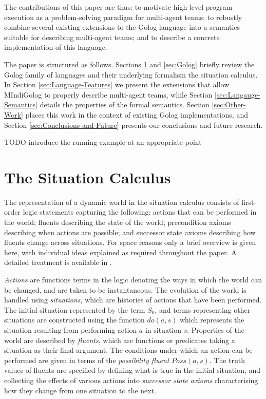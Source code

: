 \documentclass[letterpaper]{article}
\begin{document}
The contributions of this paper are thus: to motivate high-level program
execution as a problem-solving paradigm for multi-agent teams; to
robustly combine several existing extensions to the Golog language
into a semantics suitable for describing multi-agent teams; and to
describe a concrete implementation of this language.

The paper is structured as follows. Sections \ref{sec:Situation-Calculus}
and \ref{sec:Golog} briefly review the Golog family of languages
and their underlying formalism the situation calculus. In Section
\ref{sec:Language-Features} we present the extensions that allow
MIndiGolog to properly describe multi-agent teams, while Section \ref{sec:Langauge-Semantics}
details the properties of the formal semantics.
Section \ref{sec:Other-Work} places
this work in the context of existing Golog implementations, and Section
\ref{sec:Conclusions-and-Future} presents our conclusions and future
research. 

TODO introduce the running example at an appropriate point


\section{The Situation Calculus}

\label{sec:Situation-Calculus}

The representation of a dynamic world in the situation calculus consists
of first-order logic statements capturing the following: actions that
can be performed in the world; fluents describing the state of the
world; precondition axioms describing when actions are possible; and
successor state axioms describing how fluents change across situations.
For space reasons only a brief overview is given here, with individual
ideas explained as required throughout the paper. A detailed treatment
is available in \cite{pirri99contributions_sitcalc}.

\emph{Actions} are functions terms in the logic denoting the ways
in which the world can be changed, and are taken to be instantaneous.
The evolution of the world is handled using \emph{situations}, which
are histories of actions that have been performed. The initial situation
represented by the term $S_{0}$, and terms representing other situations
are constructed using the function $do(a,s)$ which represents the
situation resulting from performing action $a$ in situation $s$.
Properties of the world are described by \emph{fluents}, which are
functions or predicates taking a situation as their final argument.
The conditions under which an action can be performed are given in
terms of the \emph{possibility fluent} $Poss(a,s)$. The truth values
of fluents are specified by defining what is true in the initial situation,
and collecting the effects of various actions into \emph{successor
state axioms} characterising how they change from one situation to
the next.
\end{document}
